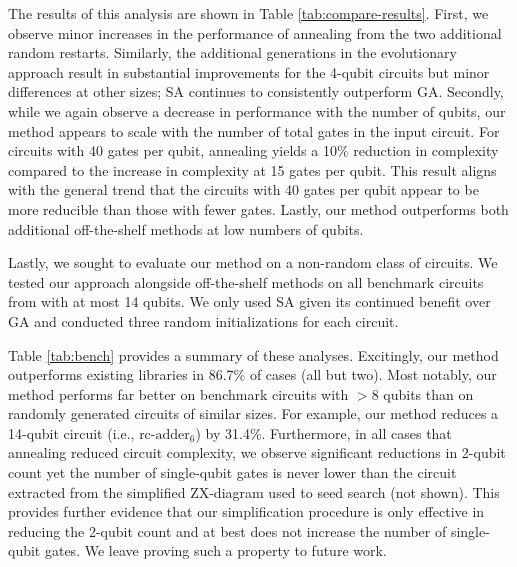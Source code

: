 The results of this analysis are shown in Table \ref{tab:compare-results}.
First, we observe minor increases in the performance of annealing from the two additional random restarts.
Similarly, the additional generations in the evolutionary approach result in substantial improvements for the 4-qubit circuits but minor differences at other sizes;
SA continues to consistently outperform GA.
Secondly, while we again observe a decrease in performance with the number of qubits, our method appears to scale with the number of total gates in the input circuit.
For circuits with 40 gates per qubit, annealing yields a 10\% reduction in complexity compared to the increase in complexity at 15 gates per qubit.
This result aligns with the general trend that the circuits with 40 gates per qubit appear to be more reducible than those with fewer gates.
Lastly, our method outperforms both additional off-the-shelf methods at low numbers of qubits.

Lastly, we sought to evaluate our method on a non-random class of circuits.
We tested our approach alongside off-the-shelf methods on all benchmark circuits from \cite{kissinger2019reducing} with at most 14 qubits.
We only used SA given its continued benefit over GA and conducted three random initializations for each circuit.

Table \ref{tab:bench} provides a summary of these analyses.
Excitingly, our method outperforms existing libraries in 86.7\% of cases (all but two).
Most notably, our method performs far better on benchmark circuits with $>8$ qubits than on randomly generated circuits of similar sizes.
For example, our method reduces a 14-qubit circuit (i.e., $\text{rc-adder}_6$) by 31.4\%.
Furthermore, in all cases that annealing reduced circuit complexity, we observe significant reductions in 2-qubit count yet the number of single-qubit gates is never lower than the circuit extracted from the simplified ZX-diagram used to seed search (not shown).
This provides further evidence that our simplification procedure is only effective in reducing the 2-qubit count and at best does not increase the number of single-qubit gates.
We leave proving such a property to future work.


